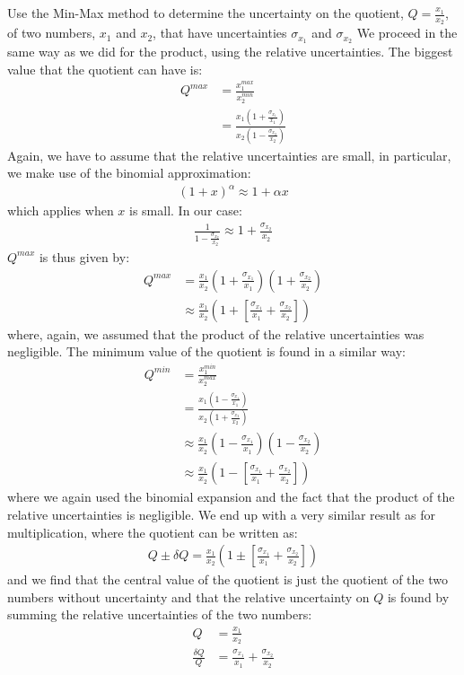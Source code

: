\begin{example}{}{Use the Min-Max method to determine the uncertainty on the quotient, $Q=\frac{x_1}{x_2}$, of two numbers, $x_1$ and $x_2$, that have uncertainties $\sigma_{x_1}$ and $\sigma_{x_2}$}{}
We proceed in the same way as we did for the product, using the relative uncertainties. The biggest value that the quotient can have is:
\begin{align*}
Q^{max}&=\frac{x_1^{max}}{x_2^{min}}\nonumber\\
  &=\frac{x_1\left(1+\frac{\sigma_{x_1}}{x_1}\right)}{x_2\left(1-\frac{\sigma_{x_2}}{x_2}\right)}
\end{align*}
Again, we have to assume that the relative uncertainties are small, in particular, we make use of the binomial approximation:
\begin{align*}
(1+x)^\alpha\approx 1+\alpha x
\end{align*}
which applies when $x$ is small. In our case:
\begin{align*}
\frac{1}{1-\frac{\sigma_{x_2}}{x_2}}\approx 1+\frac{\sigma_{x_2}}{x_2}
\end{align*}
$Q^{max}$ is thus given by:
\begin{align*}
Q^{max}&=\frac{x_1}{x_2}\left(1+\frac{\sigma_{x_1}}{x_1}\right)\left(1+\frac{\sigma_{x_2}}{x_2}\right)\\
  &\approx \frac{x_1}{x_2}\left(1+\left[\frac{\sigma_{x_1}}{x_1}+\frac{\sigma_{x_2}}{x_2}\right]\right)
\end{align*}
where, again, we assumed that the product of the relative uncertainties was negligible. The minimum value of the quotient is found in a similar way:
\begin{align*}
Q^{min}&=\frac{x_1^{min}}{x_2^{max}}\nonumber\\
  &=\frac{x_1\left(1-\frac{\sigma_{x_1}}{x_1}\right)}{x_2\left(1+\frac{\sigma_{x_2}}{x_2}\right)}\\
  &\approx\frac{x_1}{x_2}\left(1-\frac{\sigma_{x_1}}{x_1}\right)\left(1-\frac{\sigma_{x_2}}{x_2}\right)\\
  &\approx \frac{x_1}{x_2}\left(1-\left[\frac{\sigma_{x_1}}{x_1}+\frac{\sigma_{x_2}}{x_2}\right]\right)
\end{align*}
where we again used the binomial expansion and the fact that the product of the relative uncertainties is negligible. We end up with a very similar result as for multiplication, where the quotient can be written as:
\begin{align*}
Q \pm \delta Q = \frac{x_1}{x_2}\left(1\pm\left[\frac{\sigma_{x_1}}{x_1}+\frac{\sigma_{x_2}}{x_2}\right]\right)
\end{align*}
and we find that the central value of the quotient is just the quotient of the two numbers without uncertainty and that the relative uncertainty on $Q$ is found by summing the relative uncertainties of the two numbers:
\begin{align*}
Q&=\frac{x_1}{x_2}\\
\frac{\delta Q}{Q} &= \frac{\sigma_{x_1}}{x_1}+\frac{\sigma_{x_2}}{x_2}
\end{align*}
\end{example}
